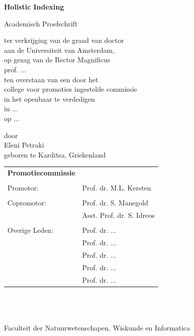 \documentclass[11pt, oneside]{Thesis} %
\begin{document}
\pagestyle{fancy}
\begin{center}

\vspace*{3cm}
{\huge\bf Holistic Indexing}\\

\vspace*{3cm}

{\sc Academisch Proefschrift}

\vspace{1cm}
ter verkrijging van de graad van doctor\\
aan de Universiteit van Amsterdam,\\
op gezag van de Rector Magnificus\\
prof. ... \\
ten overstaan van een door het\\ 
college voor promoties ingestelde commissie\\
in het openbaar te verdedigen\\
in ... \\
op ...

\vspace*{3cm}

door\\
Eleni Petraki\\
geboren te Karditsa, Griekenland\\
\end{center}
\clearpage

\pagestyle{fancy}
\noindent
\begin{tabular}{ll}
\textbf{Promotiecommissie}  & \\
	   & \\
Promotor:  & Prof. dr. M.L. Kersten\\
           & \\
Copromotor:& Prof. dr. S. Manegold\\
	   & Asst. Prof. dr. S. Idreos\\
           & \\
Overige Leden: & Prof. dr. ... \\
           & Prof. dr. ... \\
           & Prof. dr. ... \\
           & Prof. dr. ... \\
           & Prof. dr. ... \\
\end{tabular}
\\
\\
\\
\noindent
Faculteit der Natuurwetenschapen, Wiskunde en Informatica
\clearpage 
\end{document}
